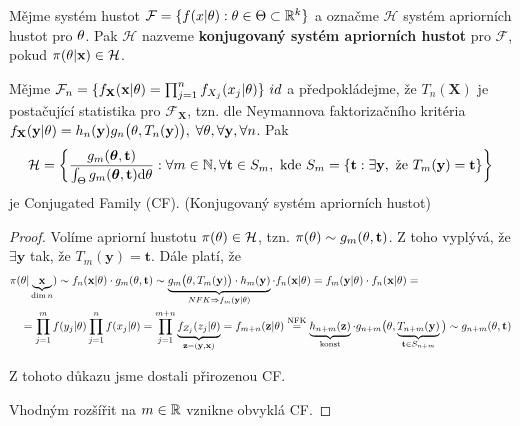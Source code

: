 \begin{define}
	Mějme systém hustot $\mathcal{F}=\{f(x|\theta):\theta\in\Theta\subset\mathbb{R}^k\}$ a označme $\mathcal{H}$ systém apriorních hustot pro $\theta$. Pak $\mathcal{H}$ nazveme \textbf{konjugovaný systém apriorních hustot} pro $\mathcal{F}$, pokud $\pi(\theta|\textbf{x})\in\mathcal{H}$.
\end{define}
\begin{theorem}
	Mějme $\mathcal{F}_n=\{f_{\textbf{X}}(\textbf{x}|\theta)=\prod_{j=1}^n f_{X_j}(x_j|\theta)\} ~id$ a předpokládejme, že $T_n(\textbf{X})$ je postačující statistika pro $\mathcal{F}_\textbf{X}$, tzn. dle Neymannova faktorizačního kritéria $f_{\textbf{X}}(\textbf{y}|\theta)=h_n(\textbf{y})g_n\big(\theta,T_n(\textbf{y})\big),$ $\forall\theta,\forall\textbf{y},\forall n$. Pak $$\mathcal{H}=\bigg\{\frac{g_m(\boldsymbol{\theta},\textbf{t})}{\int_{\Theta} g_m(\boldsymbol{\theta},\textbf{t})\mathrm{d}\theta}:\forall m\in\mathbb{N},\forall\textbf{t}\in S_m,\text{ kde }S_m=\{\textbf{t}:\exists\textbf{y},\text{ že }T_m(\textbf{y})=\textbf{t}\}\bigg\}$$
	je Conjugated Family (CF). (Konjugovaný systém apriorních hustot)
	\begin{proof}
		Volíme apriorní hustotu $\pi(\theta)\in\mathcal{H}$, tzn. $\pi(\theta)\sim g_m(\theta,\textbf{t})$. Z toho vyplývá, že $\exists\textbf{y}$ tak, že $T_m(\textbf{y})=\textbf{t}$. Dále platí, že \[
		\begin{split}
		\pi(&\theta|\underbrace{\textbf{x}}_{\dim n})\sim f_n(\textbf{x}|\theta)\cdot g_m(\theta,\textbf{t})\sim \underbrace{g_m\big(\theta,T_m(\textbf{y})\big)\cdot h_m(\textbf{y})}_{NFK\Rightarrow f_m(\textbf{y}|\theta)}\cdot f_n(\textbf{x}|\theta)=f_m(\textbf{y}|\theta)\cdot f_n(\textbf{x}|\theta)=\\&=\prod_{j=1}^mf(y_j|\theta)\prod_{j=1}^nf(x_j|\theta)=\prod_{j=1}^{m+n}\underbrace{f_{Z_j}(z_j|\theta)}_{\textbf{z}=(\textbf{y},\textbf{x})}=f_{m+n}(\textbf{z}|\theta)\overset{\text{NFK}}{=}\underbrace{h_{n+m}(\textbf{z})}_{\text{konst}}\cdot g_{n+m}\big(\theta,\underbrace{T_{n+m}(\textbf{y})}_{\textbf{t}\in S_{n+m}}\big)\sim g_{n+m}(\theta,\textbf{t})
		\end{split}
		\]
		
		Z tohoto důkazu jsme dostali přirozenou CF.
		
		Vhodným rozšířit na $m\in\mathbb{R}$ vznikne obvyklá CF.
	\end{proof}
\end{theorem}
